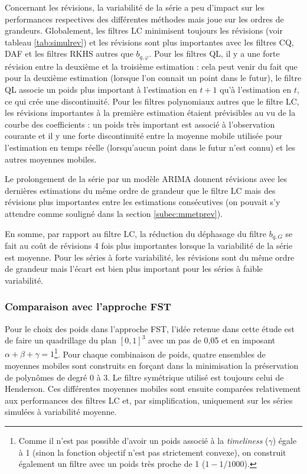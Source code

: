 \documentclass[
  12pt,
  french,
  12pt,a4paper]{article}
\newcommand\1{\mathds{1}}
\begin{document}
Concernant les révisions, la variabilité de la série a peu d'impact sur les performances respectives des différentes méthodes mais joue sur les ordres de grandeurs.
Globalement, les filtres LC minimisent toujours les révisions (voir tableau \ref{tab:simulrev}) et les révisions sont plus importantes avec les filtres CQ, DAF et les filtres RKHS autres que \(b_{q,\varphi}\).
Pour les filtres QL, il y a une forte révision entre la deuxième et la troisième estimation : cela peut venir du fait que pour la deuxième estimation (lorsque l'on connait un point dans le futur), le filtre QL associe un poids plus important à l'estimation en \(t+1\) qu'à l'estimation en \(t\), ce qui crée une discontinuité.
Pour les filtres polynomiaux autres que le filtre LC, les révisions importantes à la première estimation étaient prévisibles au vu de la courbe des coefficients : un poids très important est associé à l'observation courante et il y une forte discontinuité entre la moyenne mobile utilisée pour l'estimation en temps réelle (lorsqu'aucun point dans le futur n'est connu) et les autres moyennes mobiles.

Le prolongement de la série par un modèle ARIMA donnent révisions avec les dernières estimations du même ordre de grandeur que le filtre LC mais des révisions plus importantes entre les estimations consécutives (on pouvait s'y attendre comme souligné dans la section \ref{subec:mmetprev}).

En somme, par rapport au filtre LC, la réduction du déphasage du filtre \(b_{q,G}\) se fait au coût de révisions 4 fois plus importantes lorsque la variabilité de la série est moyenne.
Pour les séries à forte variabilité, les révisions sont du même ordre de grandeur mais l'écart est bien plus important pour les séries à faible variabilité.

\hypertarget{comparaison-avec-lapproche-fst}{%
\subsubsection{Comparaison avec l'approche FST}\label{comparaison-avec-lapproche-fst}}

Pour le choix des poids dans l'approche FST, l'idée retenue dans cette étude est de faire un quadrillage du plan \([0,1]^3\) avec un pas de 0,05 et en imposant \(\alpha + \beta + \gamma = 1\)\footnote{
  Comme il n'est pas possible d'avoir un poids associé à la \emph{timeliness} (\(\gamma\)) égale à 1 (sinon la fonction objectif n'est pas strictement convexe), on construit également un filtre avec un poids très proche de 1 (\(1-1/1000\)).}.
Pour chaque combinaison de poids, quatre ensembles de moyennes mobiles sont construits en forçant dans la minimisation la préservation de polynômes de degré 0 à 3.
Le filtre symétrique utilisé est toujours celui de Henderson.
Ces différentes moyennes mobiles sont ensuite comparées relativement aux performances des filtres LC et, par simplification, uniquement sur les séries simulées à variabilité moyenne.
\end{document}

